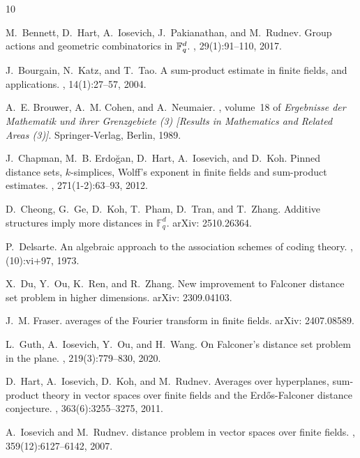 \documentclass[11pt]{article}
\newcommand{\1}{\mathbf{1}}
\begin{document}
\begin{thebibliography}{10}
	
	M.~Bennett, D.~Hart, A.~Iosevich, J.~Pakianathan, and M.~Rudnev.
	\newblock Group actions and geometric combinatorics in {$\Bbb{F}_q^d$}.
	, 29(1):91--110, 2017.
	
	J.~Bourgain, N.~Katz, and T.~Tao.
	\newblock A sum-product estimate in finite fields, and applications.
	, 14(1):27--57, 2004.
	
	A.~E. Brouwer, A.~M. Cohen, and A.~Neumaier.
	, volume~18 of {\em Ergebnisse der
		Mathematik und ihrer Grenzgebiete (3) [Results in Mathematics and Related
		Areas (3)]}.
	\newblock Springer-Verlag, Berlin, 1989.
	
	J.~Chapman, M.~B. {Erdo\u{g}an}, D.~Hart, A.~Iosevich, and D.~Koh.
	\newblock Pinned distance sets, {$k$}-simplices, {W}olff's exponent in finite
	fields and sum-product estimates.
	, 271(1-2):63--93, 2012.
	
	D.~Cheong, G.~Ge, D.~Koh, T.~Pham, D.~Tran, and T.~Zhang.
	\newblock Additive structures imply more distances in {$\mathbb{F}_{q}^{d}$}.
	\newblock arXiv: 2510.26364.
	
	P.~Delsarte.
	\newblock An algebraic approach to the association schemes of coding theory.
	, (10):vi+97, 1973.
	
	X.~Du, Y.~Ou, K.~Ren, and R.~Zhang.
	\newblock New improvement to {Falconer} distance set problem in higher
	dimensions.
	\newblock arXiv: 2309.04103.
	
	J.~M. Fraser.
	 averages of the {Fourier} transform in finite fields.
	\newblock arXiv: 2407.08589.
	
	L.~Guth, A.~Iosevich, Y.~Ou, and H.~Wang.
	\newblock On {F}alconer's distance set problem in the plane.
	, 219(3):779--830, 2020.
	
	D.~Hart, A.~Iosevich, D.~Koh, and M.~Rudnev.
	\newblock Averages over hyperplanes, sum-product theory in vector spaces over
	finite fields and the {{E}rd\H{o}s-{F}alconer} distance conjecture.
	, 363(6):3255--3275, 2011.
	
	A.~Iosevich and M.~Rudnev.
	 distance problem in vector spaces over finite fields.
	, 359(12):6127--6142, 2007.
	

\end{thebibliography}
\end{document}
